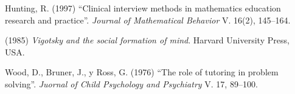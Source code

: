 \begin{titlepage}
\begin{thebibliography}{99}
 {\sc Hunting, R. } (1997) ``Clinical interview methods in mathematics education research and practice''. \emph{Journal of Mathematical Behavior} V. 16(2), 145--164.

 (1985) {\it Vigotsky and the social formation of mind}.  Harvard University Press, USA.

 {\sc Wood, D., Bruner, J., y Ross, G. } (1976) ``The role of tutoring in problem solving''. \emph{Juornal of Child Psychology and Psychiatry} V. 17, 89--100.
\end{thebibliography}
\end{titlepage}



\author{%
\vspace{2pt}\\
Jes\'us David Berrio Valbuena,\vspace{2pt} \\
  Universidad de Santander,\vspace{2pt} \\
    \hspace*{-2cm}\texttt{\scriptsize jesus\_berrio14@ hotmail.com  }\vspace{20pt} \\
    Cindy Nathalia Morgado,\vspace{2pt} \\
  Universidad de Santander,\vspace{2pt} \\
    \hspace*{-2cm}\texttt{\scriptsize cindy.morgado@ udes.edu.co}\vspace{20pt} \\
         }
\pagecolor{white}
\pagestyle{eimat}
